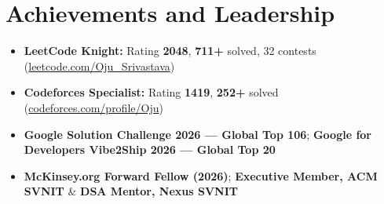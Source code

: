 \documentclass[a4paper,10pt]{article}
\begin{document}
\section{Achievements and Leadership}
\small
\begin{itemize}
  \item \textbf{LeetCode Knight:} Rating \textbf{2048}, \textbf{711+} solved, 32 contests (\href{https://leetcode.com/Oju_Srivastava}{leetcode.com/Oju\_Srivastava})
  \item \textbf{Codeforces Specialist:} Rating \textbf{1419}, \textbf{252+} solved (\href{https://codeforces.com/profile/Oju}{codeforces.com/profile/Oju})
  \item \textbf{Google Solution Challenge 2026 --- Global Top 106}; \textbf{Google for Developers Vibe2Ship 2026 --- Global Top 20}
  \item \textbf{McKinsey.org Forward Fellow (2026)}; \textbf{Executive Member, ACM SVNIT} \& \textbf{DSA Mentor, Nexus SVNIT}
\end{itemize}
\end{document}
